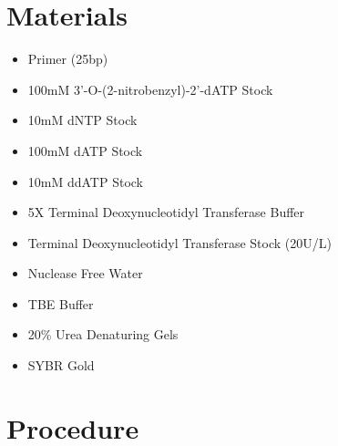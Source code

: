 \documentclass[letterpaper]{article}
\newcommand{\tdt}{Terminal Deoxynucleotidyl Transferase}
\newcommand{\uL}{\micro{}L}
\newcommand{\BdATP}{3'-O-(2-nitrobenzyl)-2'-dATP}
\begin{document}
\section{Materials}
\begin{itemize}
\item{Primer (25bp)}
\item{100mM \BdATP{} Stock}
\item{10mM dNTP Stock}
\item{100mM dATP Stock}
\item{10mM ddATP Stock}
\item{5X \tdt{} Buffer}
\item{\tdt{} Stock (20U/\uL{})}
\item{Nuclease Free Water}
\item{TBE Buffer}
\item{20\% Urea Denaturing Gels}
\item{SYBR Gold}
\end{itemize}

\section{Procedure}%
\end{document}
